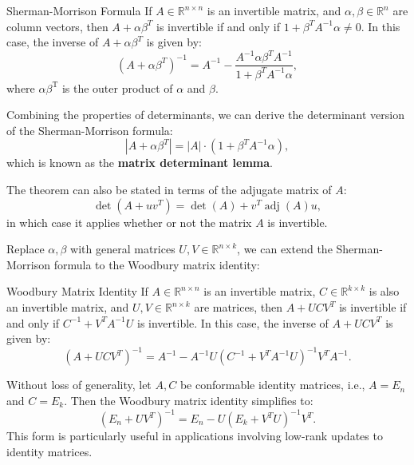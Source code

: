 \documentclass[11pt]{../../TexTemplate/elegantbook} %
\begin{document}
\begin{theorem}{Sherman-Morrison Formula}
    If \( A\in \mathbb{R}^{n\times n} \) is an invertible matrix, 
    and \( \alpha, \beta\in \mathbb{R}^n \) are column vectors, 
    then \( A + \alpha \beta^T \) is invertible if and only if \( 1 + \beta^T A^{-1} \alpha \neq 0 \). 
    In this case, the inverse of \( A + \alpha \beta^T \) is given by:
    \[
    \left(A + \alpha \beta^T\right)^{-1} = A^{-1} - \frac{A^{-1} \alpha \beta^T A^{-1}}{1 + \beta^T A^{-1} \alpha},
    \]
    where \(\alpha\beta^{\mathrm{T}}\) is the outer product of \(\alpha\) and \(\beta\).
\end{theorem}

\begin{note}
    Combining the properties of determinants, 
    we can derive the determinant version of the Sherman-Morrison formula:
    \[
    \left|A + \alpha \beta^T\right| = |A| \cdot \left(1 + \beta^T A^{-1} \alpha\right),
    \]
    which is known as the \textbf{matrix determinant lemma}.

    The theorem can also be stated in terms of the adjugate matrix of \( A \):
    \[
    \det(A + uv^T) = \det(A) + v^T \operatorname{adj}(A) u,
    \]
    in which case it applies whether or not the matrix \( A \) is invertible.
\end{note}

\vspace{0.7cm}
Replace \( \alpha, \beta\) with general matrices \( U, V \in \mathbb{R}^{n\times k} \),
we can extend the Sherman-Morrison formula to the Woodbury matrix identity:
\begin{theorem}{Woodbury Matrix Identity}
    If \( A\in \mathbb{R}^{n\times n} \) is an invertible matrix, 
    \(C\in \mathbb{R}^{k\times k}\) is also an invertible matrix, 
    and \( U, V\in \mathbb{R}^{n\times k} \) are matrices, 
    then \( A + UCV^T \) is invertible if and only if \( C^{-1} + V^T A^{-1} U \) is invertible. 
    In this case, the inverse of \( A + UCV^T \) is given by:
    \[
    \left(A + UCV^T\right)^{-1} = A^{-1} - A^{-1} U \left(C^{-1} + V^T A^{-1} U\right)^{-1} V^T A^{-1}.
    \]
\end{theorem}

Without loss of generality, let \( A, C \) be conformable identity matrices,
i.e., \( A = E_n \) and \( C = E_k \). Then the Woodbury matrix identity simplifies to:
\[
\left(E_n + UV^T\right)^{-1} = E_n - U \left(E_k + V^T U\right)^{-1} V^T.
\]
This form is particularly useful in applications involving low-rank updates to identity matrices.
\end{document}
